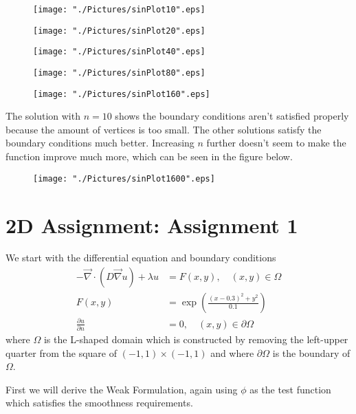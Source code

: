 \documentclass[10pt,a4paper]{article}
\begin{document}
\begin{figure}[H]
	\centering
	\texttt{[image: "./Pictures/sinPlot10".eps]}
\end{figure}
\begin{figure}[H]
	\centering
	\texttt{[image: "./Pictures/sinPlot20".eps]}
\end{figure}
\begin{figure}[H]
	\centering
	\texttt{[image: "./Pictures/sinPlot40".eps]}
\end{figure}
\begin{figure}[H]
	\centering
	\texttt{[image: "./Pictures/sinPlot80".eps]}
\end{figure}
\begin{figure}[H]
	\centering
	\texttt{[image: "./Pictures/sinPlot160".eps]}
\end{figure}

The solution with $n=10$ shows the boundary conditions aren't satisfied properly because the amount of vertices is too small. 
The other solutions satisfy the boundary conditions much better. 
Increasing $n$ further doesn't seem to make the function improve much more, which can be seen in the figure below.
\begin{figure}[H]
	\centering
	\texttt{[image: "./Pictures/sinPlot1600".eps]}
\end{figure}

\newpage
\section{2D Assignment: Assignment 1}
We start with the differential equation and boundary conditions
\def\div{\vec{\nabla}}
\begin{equation}
\label{eq:diffEq}
\begin{split}
-\div \cdot \left( D \div u \right) + \lambda u &= F(x,y),\quad (x,y) \in \Omega \\
F(x,y) &= \exp{ \left( \frac{(x-0.3)^2 + y^ 2}{0.1} \right) } \\
\frac{\partial u}{\partial n} &= 0, \quad (x,y) \in \partial \Omega
\end{split}
\end{equation}
where $\Omega$ is the L-shaped domain which is constructed by removing the left-upper quarter from the square of $(-1,1) \times (-1,1)$ and where $\partial \Omega$ is the boundary of $\Omega$. 

First we will derive the Weak Formulation, again using $\phi$ as the test function which satisfies the smoothness requirements. 
\end{document}
